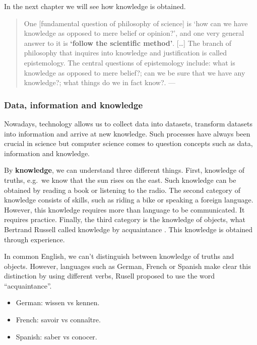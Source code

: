 \documentclass[
]{book}
\providecommand{\tightlist}{%
  \setlength{\itemsep}{0pt}\setlength{\parskip}{0pt}}
\begin{document}
In the next chapter we will see how knowledge is obtained.

\begin{quote}
One {[}fundamental question of philosophy of science{]} is `how can we have knowledge as opposed to mere belief or opinion?', and one very general answer to it is \textbf{`follow the scientific method'}. {[}\ldots{]} The branch of philosophy that inquires into knowledge and justification is called epistemology. The central questions of epistemology include: what is knowledge as opposed to mere belief?; can we be sure that we have any knowledge?; what things do we in fact know?. --- \citep{ladyman2012understanding}
\end{quote}

\hypertarget{data-information-and-knowledge}{%
\subsubsection{Data, information and knowledge}\label{data-information-and-knowledge}}

Nowadays, technology allows us to collect data into datasets, transform datasets into information and arrive at new knowledge. Such processes have always been crucial in science but computer science comes to question concepts such as data, information and knowledge. \citep{johansson2016philosophy}

By \textbf{knowledge}, we can understand three different things. First, knowledge of truths, e.g.~we know that the sun rises on the east. Such knowledge can be obtained by reading a book or listening to the radio.
The second category of knowledge consists of skills, such as riding a bike or speaking a foreign language. However, this knowledge requires more than language to be communicated. It requires practice.
Finally, the third category is the knowledge of objects, what Bertrand Russell called knowledge by acquaintance \citep{russell2001problems}. This knowledge is obtained through experience.

In common English, we can't distinguish between knowledge of truths and objects. However, languages such as German, French or Spanish make clear this distinction by using different verbs, Rusell proposed to use the word ``acquaintance''.

\begin{itemize}
\tightlist
\item
  German: wissen vs kennen.
\item
  French: savoir vs connaître.
\item
  Spanish: saber vs conocer.
\end{itemize}
\end{document}
